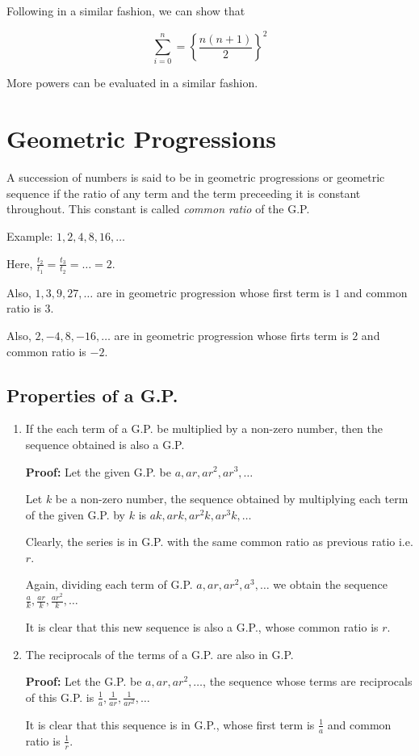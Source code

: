 Following in a similar fashion, we can show that

$$\sum_{i=0}^n = \left\{\frac{n(n + 1)}{2}\right\}^2$$

More powers can be evaluated in a similar fashion.

\section{Geometric Progressions}
A succession of numbers is said to be in geometric progressions or geometric sequence if the ratio of any term and the term
preceeding it is constant throughout. This constant is called \textit{common ratio} of the G.P.

Example: $1, 2, 4, 8, 16, \ldots$

Here, $\frac{t_2}{t_1} = \frac{t_3}{t_2} = \ldots = 2$.

Also, $1, 3, 9, 27,\ldots$ are in geometric progression whose first term is $1$ and common ratio is $3$.

Also, $2, -4, 8, -16, \ldots$ are in geometric progression whose firts term is $2$ and common ratio is $-2$.

\subsection{Properties of a G.P.}
\begin{enumerate}
\item If the each term of a G.P. be multiplied by a non-zero number, then the sequence obtained is also a G.P.

  \textbf{Proof:} Let the given G.P. be $a, ar, ar^2, ar^3, \ldots$

  Let $k$ be a non-zero number, the sequence obtained by multiplying each term of the given G.P. by $k$ is $ak, ark, ar^2k, ar^3k,
  \ldots$

  Clearly, the series is in G.P. with the same common ratio as previous ratio i.e. $r$.

  Again, dividing each term of G.P. $a, ar, ar^2, a^3, \ldots$ we obtain the sequence $\frac{a}{k}, \frac{ar}{k}, \frac{ar^2}{k},
  \ldots$

  It is clear that this new sequence is also a G.P., whose common ratio is $r$.
\item The reciprocals of the terms of a G.P. are also in G.P.

  \textbf{Proof:} Let the G.P. be $a, ar, ar^2, \ldots$, the sequence whose terms are reciprocals of this G.P. is $\frac{1}{a},
  \frac{1}{ar}, \frac{1}{ar^2}, \ldots$

  It is clear that this sequence is in G.P., whose first term is $\frac{1}{a}$ and common ratio is $\frac{1}{r}$.
\end{enumerate}

